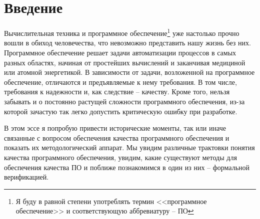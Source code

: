 \section{Введение}

Вычислительная техника и программное обеспечение\footnote{Я буду в равной степени употреблять термин <<программное обеспечение>> и соответствующую аббревиатуру -- ПО} уже настолько прочно вошли в обиход человечества, что невозможно представить нашу жизнь без них. Программное обеспечение решает задачи автоматизации процессов в самых разных областях, начиная от простейших вычислений и заканчивая медициной или атомной энергетикой. В зависимости от задачи, возложенной на программное обеспечение, отличаются и предъявляемые к нему требования. В том числе, требования к надежности и, как следствие -- качеству. Кроме того, нельзя забывать и о постоянно растущей сложности программного обеспечения, из-за которой зачастую так легко допустить критическую ошибку при разработке.

В этом эссе я попробую привести исторические моменты, так или иначе связанные с вопросом обеспечения качества программного обеспечения и показать их методологический аппарат. Мы увидим различные трактовки понятия качества программного обеспечения, увидим, какие существуют методы для обеспечения качества ПО и поближе познакомимся в один из них -- формальной верификацией.
